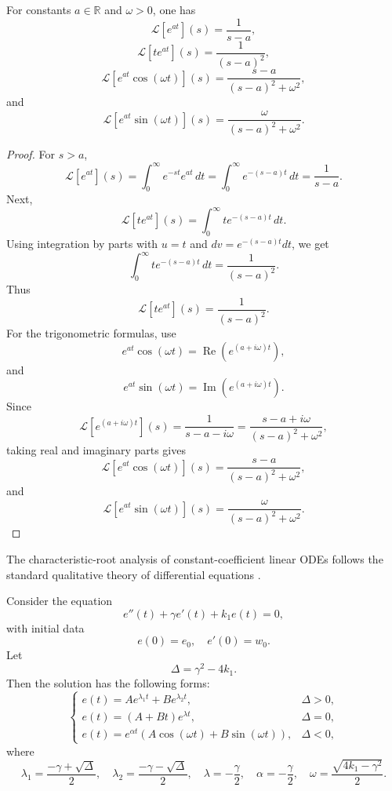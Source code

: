 ﻿\documentclass[12pt]{article}
\begin{document}
\begin{lemma}
For constants $a \in \mathbb R$ and $\omega > 0$, one has
\[
 \mathcal L[e^{at}](s) = \frac{1}{s - a},
\]
\[
 \mathcal L[te^{at}](s) = \frac{1}{(s - a)^2},
\]
\[
 \mathcal L[e^{at}\cos(\omega t)](s)
 =
 \frac{s - a}{(s - a)^2 + \omega^2},
\]
and
\[
 \mathcal L[e^{at}\sin(\omega t)](s)
 =
 \frac{\omega}{(s - a)^2 + \omega^2}.
\]
\end{lemma}
\begin{proof}
For $s > a$,
\[
 \mathcal L[e^{at}](s)
 = \int_0^\infty e^{-st}e^{at}\, dt
 = \int_0^\infty e^{-(s - a)t}\, dt
 =
 \frac{1}{s - a}.
\]
Next,
\[
 \mathcal L[te^{at}](s)
 = \int_0^\infty t e^{-(s - a)t}\, dt.
\]
Using integration by parts with $u = t$ and $dv = e^{-(s - a)t}dt$, we get
\[ \int_0^\infty t e^{-(s - a)t}\, dt
 =
 \frac{1}{(s - a)^2}.
\]
Thus
\[
 \mathcal L[te^{at}](s) = \frac{1}{(s - a)^2}.
\]
For the trigonometric formulas, use
\[
 e^{at}\cos(\omega t) = \operatorname{Re}\left(e^{(a + i\omega)t}\right),
\]
and
\[
 e^{at}\sin(\omega t) = \operatorname{Im}\left(e^{(a + i\omega)t}\right).
\]
Since
\[
 \mathcal L[e^{(a + i\omega)t}](s)
 =
 \frac{1}{s - a - i\omega}
 =
 \frac{s - a + i\omega}{(s - a)^2 + \omega^2},
\]
taking real and imaginary parts gives
\[
 \mathcal L[e^{at}\cos(\omega t)](s)
 =
 \frac{s - a}{(s - a)^2 + \omega^2},
\]
and
\[
 \mathcal L[e^{at}\sin(\omega t)](s)
 =
 \frac{\omega}{(s - a)^2 + \omega^2}.
\]
\end{proof}
The characteristic-root analysis of constant-coefficient linear ODEs follows the standard qualitative theory of differential equations \cite{kelley_peterson_ode_2010}.
\begin{theorem}
Consider the equation
\[
 e''(t) + \gamma e'(t) + k_1e(t) = 0,
\]
with initial data
\[
 e(0) = e_0,\quad e'(0) = w_0.
\]
Let
\[
 \Delta = \gamma^2 - 4k_1.
\]
Then the solution has the following forms:
\[
\begin{cases}
 e(t) = Ae^{\lambda_1t} + Be^{\lambda_2t}, & \Delta > 0,\\[4pt]
 e(t) = (A + Bt)e^{\lambda t}, & \Delta = 0,\\[4pt]
 e(t) = e^{\alpha t}\left(A\cos(\omega t) + B\sin(\omega t)\right), & \Delta < 0,
\end{cases}
\]
where
\[
 \lambda_1 = \frac{-\gamma + \sqrt{\Delta}}2,
 \quad
 \lambda_2 = \frac{-\gamma - \sqrt{\Delta}}2,
 \quad
 \lambda = -\frac{\gamma}{2},
 \quad
 \alpha = -\frac{\gamma}{2},
 \quad
 \omega = \frac{\sqrt{4k_1 - \gamma^2}}2.
\]
\end{theorem}
\end{document}
